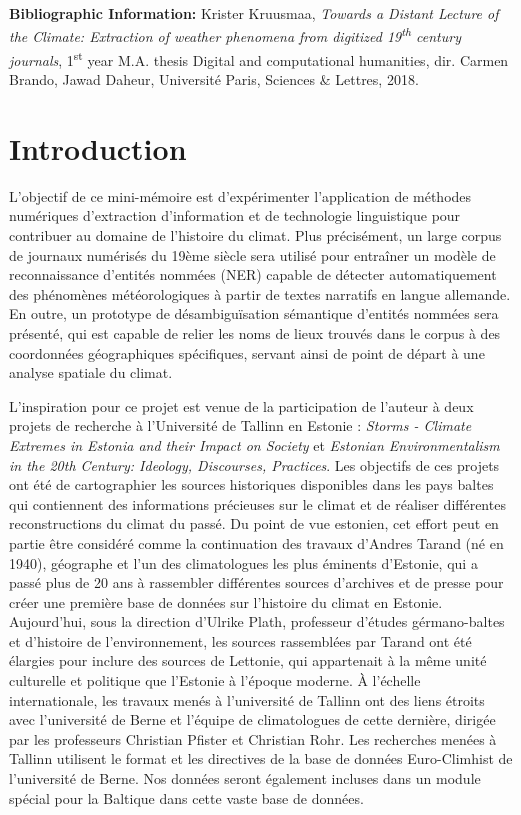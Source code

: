 \documentclass[a4paper,twoside,12pt]{article}
\begin{document}
\textbf{Bibliographic Information:} Krister Kruusmaa, \textit{Towards a Distant Lecture of the Climate: Extraction of weather phenomena from digitized 19\textsuperscript{th} century journals}, 1\textsuperscript{st} year M.A. thesis  \og Digital and computational humanities\fg{}, dir. Carmen Brando, Jawad Daheur, Université Paris, Sciences \& Lettres, 2018.

\null\newpage
\thispagestyle{empty}
\null\newpage

\section*{Introduction}
\setcounter{page}{1}


L'objectif de ce mini-mémoire est d'expérimenter l'application de méthodes numériques d'extraction d'information et de technologie linguistique pour contribuer au domaine de l'histoire du climat. Plus précisément, un large corpus de journaux numérisés du 19ème siècle sera utilisé pour entraîner un modèle de reconnaissance d'entités nommées (NER) capable de détecter automatiquement des phénomènes météorologiques à partir de textes narratifs en langue allemande. En outre, un prototype de désambiguïsation sémantique d'entités nommées sera présenté, qui est capable de relier les noms de lieux trouvés dans le corpus à des coordonnées géographiques spécifiques, servant ainsi de point de départ à une analyse spatiale du climat.

L'inspiration pour ce projet est venue de la participation de l'auteur à deux projets de recherche à l'Université de Tallinn en Estonie : \textit{Storms - Climate Extremes in Estonia and their Impact on Society} et \textit{Estonian Environmentalism in the 20th Century: Ideology, Discourses, Practices}. Les objectifs de ces projets ont été de cartographier les sources historiques disponibles dans les pays baltes qui contiennent des informations précieuses sur le climat et de réaliser différentes reconstructions du climat du passé. Du point de vue estonien, cet effort peut en partie être considéré comme la continuation des travaux d'Andres Tarand (né en 1940), géographe et l'un des climatologues les plus éminents d'Estonie, qui a passé plus de 20 ans à rassembler différentes sources d'archives et de presse pour créer une première base de données sur l'histoire du climat en Estonie. Aujourd'hui, sous la direction d'Ulrike Plath, professeur d'études gérmano-baltes et d'histoire de l'environnement, les sources rassemblées par Tarand ont été élargies pour inclure des sources de Lettonie, qui appartenait à la même unité culturelle et politique que l'Estonie à l'époque moderne. À l'échelle internationale, les travaux menés à l'université de Tallinn ont des liens étroits avec l'université de Berne et l'équipe de climatologues de cette dernière, dirigée par les professeurs Christian Pfister et Christian Rohr. Les recherches menées à Tallinn utilisent le format et les directives de la base de données Euro-Climhist de l'université de Berne. Nos données seront également incluses dans un module spécial pour la Baltique dans cette vaste base de données.
\end{document}
